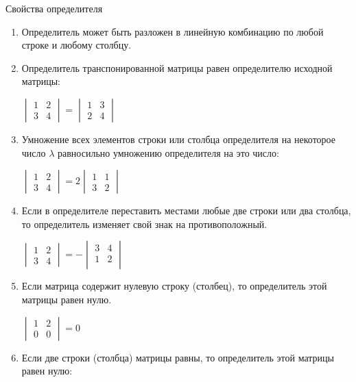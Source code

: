 \documentclass[unicode,11pt,notheorems]{beamer}
\begin{document}
\begin{frame}[allowframebreaks]{Свойства определителя}{}
	\begin{enumerate}
	\item 
	    Определитель может быть разложен в линейную комбинацию по любой строке и любому столбцу.
	\item 
	    Определитель транспонированной матрицы равен определителю исходной матрицы:
   
	    \hfill
	    \alert{$
		\begin{vmatrix}
			1 & 2\\
			3 & 4
		\end{vmatrix} 
		=
		\begin{vmatrix}
			1 & 3\\
			2 & 4
		\end{vmatrix} 
		$}
	\item 
	    Умножение всех элементов строки или столбца определителя на некоторое число $\lambda$ равносильно умножению определителя на это число:
    
	    \hfill
		\alert{$
		\begin{vmatrix}
			1 & 2\\
			3 & 4
		\end{vmatrix} 
		= 
		2\begin{vmatrix}
			1 & 1\\
			3 & 2
		\end{vmatrix} 
		$}

	\item 
	    Если в определителе переставить местами любые две строки или два столбца, то определитель изменяет свой знак на противоположный.
    
	    \hfill
		\alert{$
		\begin{vmatrix}
			1 & 2\\
			3 & 4
		\end{vmatrix} 
		= 
		-\begin{vmatrix}
			3 & 4\\
			1 & 2\\
		\end{vmatrix} 
		$}
	
	\item 
	    Если матрица содержит \alert{нулевую строку} (столбец), то определитель этой матрицы равен нулю.

	    \hfill
		\alert{$
		\begin{vmatrix}
			1 & 2\\
			0 & 0
		\end{vmatrix} 
		= 0
		$}
	\item 
		Если две строки (столбца) матрицы \alert{равны}, то определитель этой матрицы равен нулю:


\end{enumerate}
\end{frame}
\end{document}
